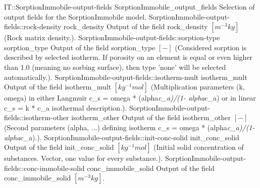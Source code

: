 \begin{SelectionType}
	{IT::SorptionImmobile-output-fields}
	{SorptionImmobile{\_}output{\_}fields}
	{{{Selection of output fields for the SorptionImmobile model.}}}
		\SelectionItem
			{SorptionImmobile-output-fields::rock-density}
			{rock{\_}density}
			{{{Output of the field rock{\_}density }{$[m^{-3}kg]$}{ (Rock matrix density.).}}}
		\SelectionItem
			{SorptionImmobile-output-fields::sorption-type}
			{sorption{\_}type}
			{{{Output of the field sorption{\_}type }{$[-]$}{ (Considered sorption is described by selected isotherm. If porosity on an element is equal or even higher than 1.0 (meaning no sorbing surface), then type 'none' will be selected automatically.).}}}
		\SelectionItem
			{SorptionImmobile-output-fields::isotherm-mult}
			{isotherm{\_}mult}
			{{{Output of the field isotherm{\_}mult }{$[kg^{-1}mol]$}{ (Multiplication parameters (k, omega) in either Langmuir c{\_}s = omega * (alpha}\textit{c{\_}a)/(1- alpha}{c{\_}a) or in linear c{\_}s = k * c{\_}a isothermal description.).}}}
		\SelectionItem
			{SorptionImmobile-output-fields::isotherm-other}
			{isotherm{\_}other}
			{{{Output of the field isotherm{\_}other }{$[-]$}{ (Second parameters (alpha, ...) defining isotherm  c{\_}s = omega * (alpha}\textit{c{\_}a)/(1- alpha}{c{\_}a).).}}}
		\SelectionItem
			{SorptionImmobile-output-fields::init-conc-solid}
			{init{\_}conc{\_}solid}
			{{{Output of the field init{\_}conc{\_}solid }{$[kg^{-1}mol]$}{ (Initial solid concentration of substances. Vector, one value for every substance.).}}}
		\SelectionItem
			{SorptionImmobile-output-fields::conc-immobile-solid}
			{conc{\_}immobile{\_}solid}
			{{{Output of the field conc{\_}immobile{\_}solid }{$[m^{-3}kg]$}{.}}}
\end{SelectionType}
